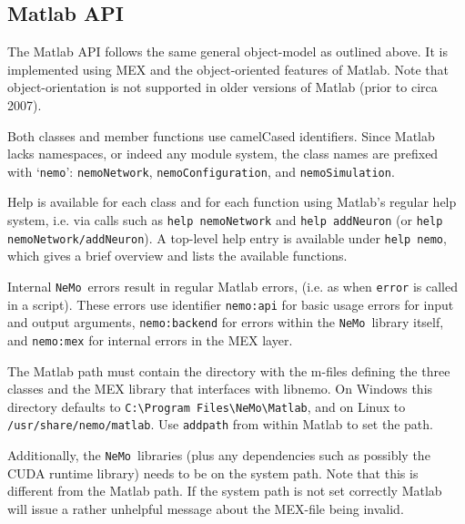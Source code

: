 \documentclass[a4paper]{article}
\newcommand{\nemo}{\texttt{NeMo}}
\newcommand{\code}[1]{\texttt{#1}}
\newcommand{\file}[1]{\texttt{#1}}
\begin{document}


\newpage

\subsection{Matlab API}
\label{api:matlab}

The Matlab API follows the same general object-model as outlined above.
It is implemented using MEX and the object-oriented features of Matlab. 
Note that object-orientation is not supported in older versions of Matlab (prior to circa 2007).

Both classes and member functions use camelCased identifiers.
Since Matlab lacks namespaces, or indeed any module system,
	the class names are prefixed with `\code{nemo}':
	\code{nemoNetwork}, \code{nemoConfiguration}, and \code{nemoSimulation}.

Help is available for each class and for each function using Matlab's regular help system,
	i.e. via calls such as
		\code{help nemoNetwork} 
		and \code{help addNeuron} (or \code{help nemoNetwork/addNeuron}).
A top-level help entry is available under \code{help nemo},
	which gives a brief overview and lists the available functions.

Internal \nemo\ errors result in regular Matlab errors,
	(i.e. as when \code{error} is called in a script).
These errors use identifier
	\code{nemo:api} for basic usage errors for input and output arguments,
	\code{nemo:backend} for errors within the \nemo\ library itself, and
	\code{nemo:mex} for internal errors in the MEX layer.

The Matlab path must contain the directory with the m-files
	defining the three classes and the MEX library that interfaces with libnemo.
On Windows this directory defaults to \file{C:\textbackslash Program Files\textbackslash NeMo\textbackslash Matlab},
and on Linux to \file{/usr/share/nemo/matlab}.
Use \code{addpath} from within Matlab to set the path.

Additionally, the \nemo\ libraries (plus any dependencies such as possibly the CUDA runtime library)
	needs to be on the system path.
Note that this is different from the Matlab path.
If the system path is not set correctly Matlab will issue a rather unhelpful message about the MEX-file being invalid.
\end{document}
